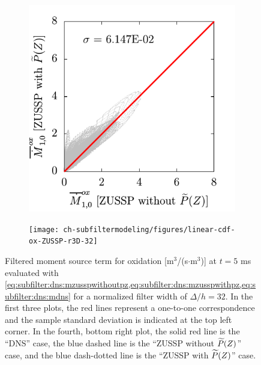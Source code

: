 \begin{figure}[ht]
\begin{subfigure}[b]{0.375\linewidth}
  \end{subfigure}
  \begin{subfigure}[b]{0.375\linewidth}
    \centering
    \includegraphics[width=\linewidth]{ch-subfiltermodeling/figures/lin-Mox4vsMox3-r3D-32}
  \end{subfigure}%
  \begin{subfigure}[b]{0.375\linewidth}
    \centering
    \texttt{[image: ch-subfiltermodeling/figures/linear-cdf-ox-ZUSSP-r3D-32]}
  \end{subfigure}
  \caption[Error Associated with \texorpdfstring{$\pz = \beta(Z;\tf{Z},\tf{Z_V})$}{P(Z) = B(Z;Z,ZV)} for \texorpdfstring{$\fst[M]{1,0}^{ox}$}{M1,0ox}]{Filtered moment source term for oxidation [m$^3$/(s$\cdot$m$^3$)] at $t = 5$ ms evaluated with \cref{eq:subfilter:dns:mzusspwithoutpz,eq:subfilter:dns:mzusspwithpz,eq:subfilter:dns:mdns} for a normalized filter width of $\Delta/h = 32$. In the first three plots, the red lines represent a one-to-one correspondence and the sample standard deviation is indicated at the top left corner. In the fourth, bottom right plot, the solid red line is the ``DNS'' case, the blue dashed line is the ``ZUSSP without $\widetilde{P}(Z)$'' case, and the blue dash-dotted line is the ``ZUSSP with $\widetilde{P}(Z)$'' case.}
  \label{fig:subfilter:dns:erroronbetaox}
\end{figure}

